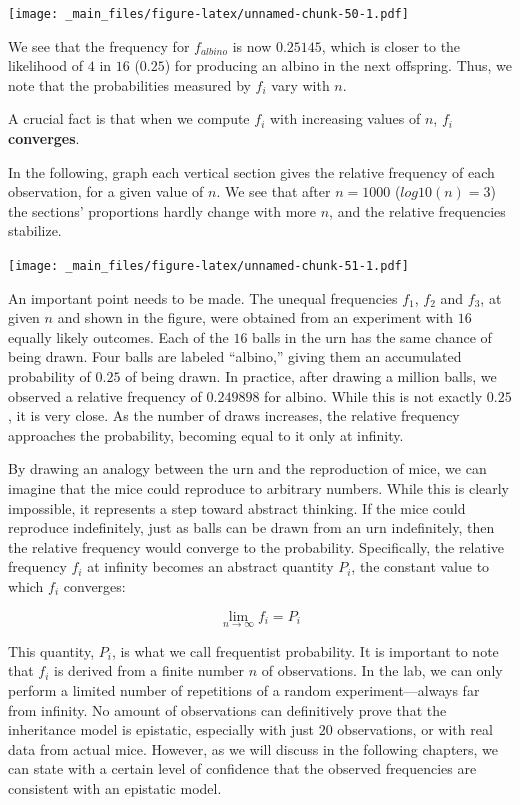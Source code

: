 \documentclass[
]{book}
\begin{document}
\texttt{[image: \_main\_files/figure-latex/unnamed-chunk-50-1.pdf]}

We see that the frequency for \(f_{albino}\) is now \(0.25145\), which is closer to the likelihood of \(4\) in \(16\) (\(0.25\)) for producing an albino in the next offspring. Thus, we note that the probabilities measured by \(f_i\) vary with \(n\).

A crucial fact is that when we compute \(f_i\) with increasing values of \(n\), \(f_i\) \textbf{converges}.

In the following, graph each vertical section gives the relative frequency of each observation, for a given value of \(n\). We see that after \(n=1000\) (\(log10(n)=3\)) the sections' proportions hardly change with more \(n\), and the relative frequencies stabilize.

\texttt{[image: \_main\_files/figure-latex/unnamed-chunk-51-1.pdf]}

An important point needs to be made. The unequal frequencies \(f_1\), \(f_2\) and \(f_3\), at given \(n\) and shown in the figure, were obtained from an experiment with \(16\) equally likely outcomes. Each of the \(16\) balls in the urn has the same chance of being drawn. Four balls are labeled ``albino,'' giving them an accumulated probability of \(0.25\) of being drawn. In practice, after drawing a million balls, we observed a relative frequency of \(0.249898\) for albino. While this is not exactly \(0.25\), it is very close. As the number of draws increases, the relative frequency approaches the probability, becoming equal to it only at infinity.

By drawing an analogy between the urn and the reproduction of mice, we can imagine that the mice could reproduce to arbitrary numbers. While this is clearly impossible, it represents a step toward abstract thinking. If the mice could reproduce indefinitely, just as balls can be drawn from an urn indefinitely, then the relative frequency would converge to the probability. Specifically, the relative frequency \(f_i\) at infinity becomes an abstract quantity \(P_i\), the constant value to which \(f_i\) converges:

\[\lim_{n \to \infty} f_i = P_i\]

This quantity, \(P_i\), is what we call frequentist probability. It is important to note that \(f_i\) is derived from a finite number \(n\) of observations. In the lab, we can only perform a limited number of repetitions of a random experiment---always far from infinity. No amount of observations can definitively prove that the inheritance model is epistatic, especially with just \(20\) observations, or with real data from actual mice. However, as we will discuss in the following chapters, we can state with a certain level of confidence that the observed frequencies are consistent with an epistatic model.
\end{document}
